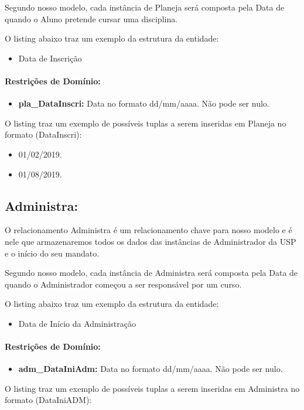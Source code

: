 \documentclass{report}
\begin{document}
	Segundo nosso modelo, cada instância de Planeja será composta pela Data de quando o Aluno pretende cursar uma disciplina.
		
	O listing abaixo traz um exemplo da estrutura da entidade:
\begin{itemize}
  \item Data de Inscrição
\end{itemize}
\paragraph{Restrições de Domínio:}
\begin{itemize}
  \item \textbf{pla\_DataInscri:} Data no formato dd/mm/aaaa. Não pode ser nulo.
\end{itemize}
O listing traz um exemplo de possíveis tuplas a serem inseridas em Planeja no formato (DataInscri):

\begin{itemize}
	\item 01/02/2019.
	\item 01/08/2019.
\end{itemize}
\subsection{Administra:}
O relacionamento Administra é um relacionamento chave para nosso modelo e é nele que armazenaremos todos os dados das instâncias de Administrador da USP e o início do seu mandato.
	
	Segundo nosso modelo, cada instância de Administra será composta pela Data de quando o Administrador começou a ser responsável por um curso.
		
	O listing abaixo traz um exemplo da estrutura da entidade:
\begin{itemize}
  \item Data de Início da Administração
\end{itemize}
\paragraph{Restrições de Domínio:}
\begin{itemize}
  \item \textbf{adm\_DataIniAdm:} Data no formato dd/mm/aaaa. Não pode ser nulo.
\end{itemize}
O listing traz um exemplo de possíveis tuplas a serem inseridas em Administra no formato (DataIniADM):
\end{document}
